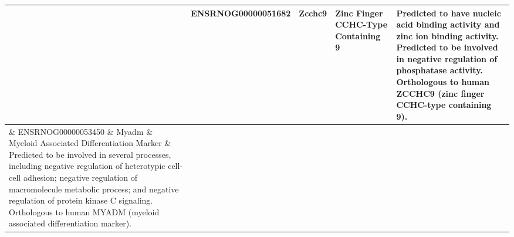 \begin{sidewaystable}[]
\begin{tabular}{lp{3cm}p{1.5cm}p{4cm}p{12cm}}
& ENSRNOG00000051682 & Zcchc9            & Zinc Finger CCHC-Type Containing 9     &  	Predicted to have nucleic acid binding activity and zinc ion binding activity. Predicted to be involved in negative regulation of phosphatase activity. Orthologous to human ZCCHC9 (zinc finger CCHC-type containing 9).                \\

\hline
\parbox[t]{2mm}{} & ENSRNOG00000053450 & Myadm             & Myeloid Associated Differentiation Marker   &     Predicted to be involved in several processes, including negative regulation of heterotypic cell-cell adhesion; negative regulation of macromolecule metabolic process; and negative regulation of protein kinase C signaling. Orthologous to human MYADM (myeloid associated differentiation marker).          \\

& ENSRNOG00000003977 & Dusp1             & Dual Specificity Phosphatase 1                                &  	Exhibits growth factor binding activity and protein tyrosine/threonine phosphatase activity. Involved in several processes, including negative regulation of nitrogen compound metabolic process; regulation of apoptotic process; and response to testosterone. Localizes to the nucleus. Used to study Huntington's disease. Biomarker of several diseases, including anti-basement membrane glomerulonephritis; brain disease (multiple); hypertension; pancreatitis; and portal hypertension. Human ortholog(s) of this gene implicated in breast cancer. Orthologous to human DUSP1 (dual specificity phosphatase 1).\\

& ENSRNOG00000004206 & Glrx5             & Glutaredoxin 5                       &  Predicted to have several functions, including 2 iron, 2 sulfur cluster binding activity; electron transfer activity; and protein disulfide oxidoreductase activity. Predicted to be involved in protein lipoylation. Localizes to the dendrite; neuronal cell body; and nucleus. Human ortholog(s) of this gene implicated in autosomal recessive pyridoxine-refractory sideroblastic anemia 3. Orthologous to human GLRX5 (glutaredoxin 5). \\

& ENSRNOG00000021106 & Gramd1a           & GRAM Domain Containing 1A             &  Predicted to have cholesterol binding activity and cholesterol transfer activity. Predicted to be involved in cellular response to cholesterol. Orthologous to human GRAMD1A (GRAM domain containing 1A).                 \\


\end{tabular}
\end{sidewaystable}
